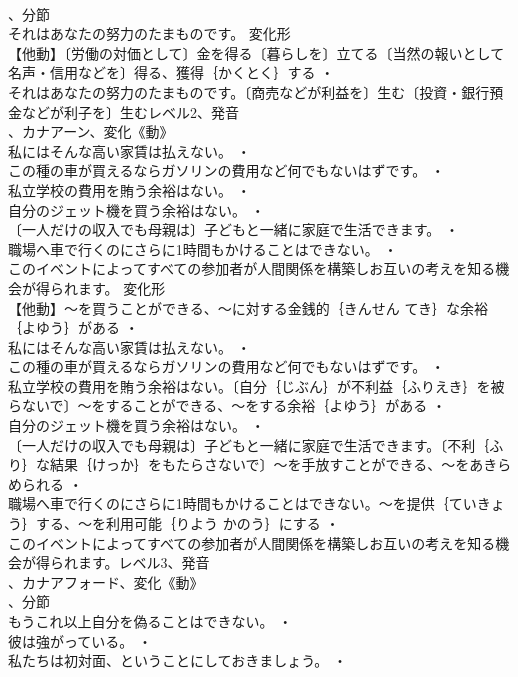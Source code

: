 \documentclass[8pt]{extreport}
\begin{document}
\begin{CJK}{UTF8}{min}
\\	、分節
\\	それはあなたの努力のたまものです。	変化形 
\\	【他動】〔労働の対価として〕金を得る〔暮らしを〕立てる〔当然の報いとして名声・信用などを〕得る、獲得｛かくとく｝する ・
\\	それはあなたの努力のたまものです。〔商売などが利益を〕生む〔投資・銀行預金などが利子を〕生むレベル2、発音
\\	、カナアーン、変化《動》
\\	私にはそんな高い家賃は払えない。 ・
\\	この種の車が買えるならガソリンの費用など何でもないはずです。 ・
\\	私立学校の費用を賄う余裕はない。 ・
\\	自分のジェット機を買う余裕はない。 ・
\\	〔一人だけの収入でも母親は〕子どもと一緒に家庭で生活できます。 ・
\\	職場へ車で行くのにさらに1時間もかけることはできない。 ・
\\	このイベントによってすべての参加者が人間関係を構築しお互いの考えを知る機会が得られます。	変化形 
\\	【他動】～を買うことができる、～に対する金銭的｛きんせん てき｝な余裕｛よゆう｝がある ・
\\	私にはそんな高い家賃は払えない。 ・
\\	この種の車が買えるならガソリンの費用など何でもないはずです。 ・
\\	私立学校の費用を賄う余裕はない。〔自分｛じぶん｝が不利益｛ふりえき｝を被らないで〕～をすることができる、～をする余裕｛よゆう｝がある ・
\\	自分のジェット機を買う余裕はない。 ・
\\	〔一人だけの収入でも母親は〕子どもと一緒に家庭で生活できます。〔不利｛ふり｝な結果｛けっか｝をもたらさないで〕～を手放すことができる、～をあきらめられる ・
\\	職場へ車で行くのにさらに1時間もかけることはできない。～を提供｛ていきょう｝する、～を利用可能｛りよう かのう｝にする ・
\\	このイベントによってすべての参加者が人間関係を構築しお互いの考えを知る機会が得られます。レベル3、発音
\\	、カナアフォード、変化《動》
\\	、分節
\\	もうこれ以上自分を偽ることはできない。 ・
\\	彼は強がっている。 ・
\\	私たちは初対面、ということにしておきましょう。 ・

\end{CJK}
\end{document}
